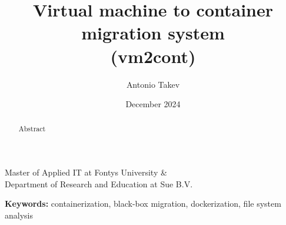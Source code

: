 \documentclass{article}
\title{
    Virtual machine to container migration system \\(vm2cont)
}
\author{
    Antonio Takev
}
\date{December 2024}
\begin{document}
\maketitle

\begin{center}
    \parbox{0.8\textwidth}{
        \centering
        Master of Applied IT at Fontys University  \& \\ 
        Department of Research and Education at Sue B.V.
    }
\end{center}

\begin{abstract}
Abstract 
\end{abstract}

\textbf{Keywords:} containerization, black-box migration, dockerization, file system analysis
\end{document}
